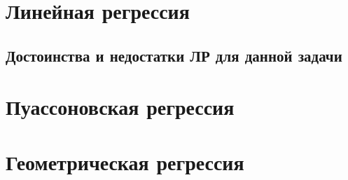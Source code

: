 \section{Линейная регрессия}

\subsection{Достоинства и недостатки ЛР для данной задачи}

\section{Пуассоновская регрессия}

\section{Геометрическая регрессия}